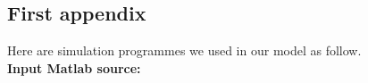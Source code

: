 \documentclass{mcmthesis}
\begin{document}
\newpage
%
%




\newpage
\begin{appendices}

  \section{First appendix}

    Here are simulation programmes we used in our model as follow.\\

    \textbf{\textcolor[rgb]{0.98,0.00,0.00}{Input Matlab source:}}


\end{appendices}
\end{document}
